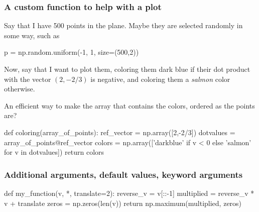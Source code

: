 \documentclass{beamer}
\newenvironment{codeblock}
    {\hfill\begin{beamerboxesrounded}[lower=codecol, width=0.8\textwidth]
    \medskip

    }
    { 
    \end{beamerboxesrounded}\hfill
    }
\theoremstyle{example}
\begin{document}
\begin{frame}[fragile]
\frametitle{A custom function to help with a plot}
Say that I have 500 points in the plane. Maybe they are selected randomly in some way, such as 

\begin{codeblock}

\begin{python}[numbers=none]
p = np.random.uniform(-1, 1, size=(500,2))
\end{python}

\end{codeblock}

Now, say that I want to plot them, coloring them dark blue if their dot product with the vector $(2,-2/3)$ is negative, and coloring them a \emph{salmon} color otherwise.

An efficient way to make the array that contains the colors, ordered as the points are?

\begin{codeblock}

\begin{python}
def coloring(array_of_points):
    ref_vector = np.array([2,-2/3])
    dotvalues = array_of_points@ref_vector
    colors = np.array(['darkblue' if v < 0 else 'salmon' for v in dotvalues])
    return colors
\end{python}

\end{codeblock}
\end{frame}

\begin{frame}[fragile]
\frametitle{Additional arguments, default values, keyword arguments}


\begin{codeblock}

\begin{python}
def my_function(v, *, translate=2):
    reverse_v = v[::-1]
    multiplied = reverse_v * v + translate
    zeros = np.zeros(len(v))
    return np.maximum(multiplied, zeros)
\end{python}

\end{codeblock}

\end{frame}
\end{document}
